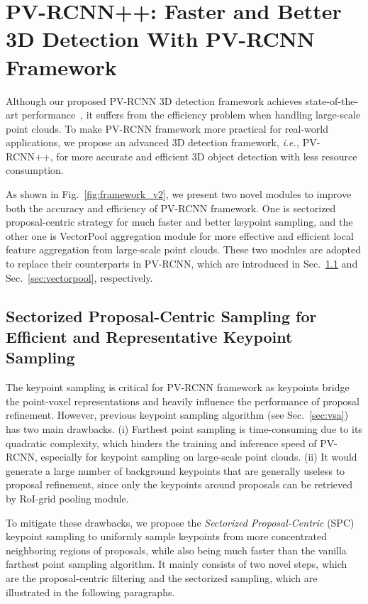 \documentclass[natbib,twocolumn]{svjour3}          \smartqed  \usepackage{graphicx}
\begin{document}
\section{PV-RCNN++: Faster and Better 3D Detection With PV-RCNN Framework}
Although our proposed PV-RCNN 3D detection framework achieves state-of-the-art performance~\citep{shi2020pv}, it suffers from the efficiency problem when handling large-scale point clouds. 
To make PV-RCNN framework more practical for real-world applications, we propose an advanced 3D detection framework, \emph{i.e.,} PV-RCNN++, for more accurate and efficient 3D object detection with less resource consumption. 

As shown in Fig.~\ref{fig:framework_v2}, we present two novel modules to improve both the accuracy and efficiency of PV-RCNN framework. One is sectorized proposal-centric strategy for much faster and better keypoint sampling, and the other one is VectorPool aggregation module for more effective and efficient local feature aggregation from large-scale point clouds. 
These two modules are adopted to replace their counterparts in PV-RCNN, which are introduced in Sec.~\ref{sec:spc} and Sec.~\ref{sec:vectorpool}, respectively.



\subsection{Sectorized Proposal-Centric Sampling for Efficient and Representative Keypoint Sampling}\label{sec:spc}
The keypoint sampling is critical for PV-RCNN framework as keypoints bridge the point-voxel representations and heavily influence the performance of proposal refinement. 
However, previous keypoint sampling algorithm (see Sec.~\ref{sec:vsa}) has two main drawbacks. 
(i) Farthest point sampling is time-consuming due to its quadratic complexity, which hinders the training and inference speed of PV-RCNN, especially for keypoint sampling on large-scale point clouds.
(ii) 
It would generate a large number of background keypoints that are generally useless to proposal refinement, since only the keypoints around proposals can be retrieved by RoI-grid pooling module. 

To mitigate these drawbacks, we propose the \textit{Sectorized Proposal-Centric} (SPC) keypoint sampling to uniformly sample keypoints from more concentrated neighboring regions of proposals, while also being much faster than the vanilla farthest point sampling algorithm. 
It mainly consists of two novel steps, which are the proposal-centric filtering and the sectorized sampling, which are illustrated in the following paragraphs.  
\end{document}
